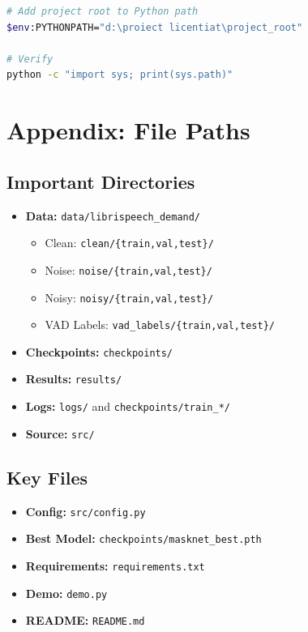 \documentclass[12pt,a4paper]{article}
\begin{document}
\begin{lstlisting}[language=bash]
# Add project root to Python path
$env:PYTHONPATH="d:\proiect licentiat\project_root"

# Verify
python -c "import sys; print(sys.path)"
\end{lstlisting}

\section{Appendix: File Paths}

\subsection{Important Directories}

\begin{itemize}
    \item \textbf{Data:} \texttt{data/librispeech\_demand/}
    \begin{itemize}
        \item Clean: \texttt{clean/\{train,val,test\}/}
        \item Noise: \texttt{noise/\{train,val,test\}/}
        \item Noisy: \texttt{noisy/\{train,val,test\}/}
        \item VAD Labels: \texttt{vad\_labels/\{train,val,test\}/}
    \end{itemize}
    \item \textbf{Checkpoints:} \texttt{checkpoints/}
    \item \textbf{Results:} \texttt{results/}
    \item \textbf{Logs:} \texttt{logs/} and \texttt{checkpoints/train\_*/}
    \item \textbf{Source:} \texttt{src/}
\end{itemize}

\subsection{Key Files}

\begin{itemize}
    \item \textbf{Config:} \texttt{src/config.py}
    \item \textbf{Best Model:} \texttt{checkpoints/masknet\_best.pth}
    \item \textbf{Requirements:} \texttt{requirements.txt}
    \item \textbf{Demo:} \texttt{demo.py}
    \item \textbf{README:} \texttt{README.md}
\end{itemize}
\end{document}
